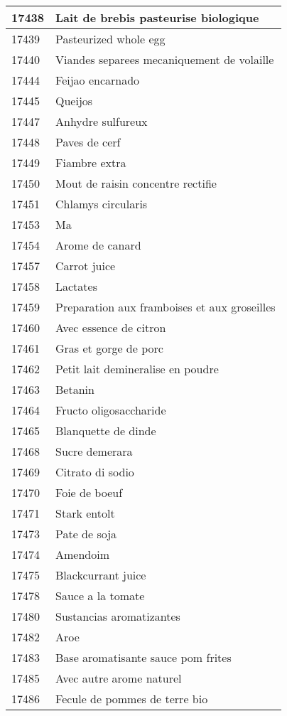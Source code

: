 \begin{longtable}{|l|l|}
17438 & Lait de brebis pasteurise biologique \\ \hline 
17439 & Pasteurized whole egg \\ \hline 
17440 & Viandes separees mecaniquement de volaille \\ \hline 
17444 & Feijao encarnado \\ \hline 
17445 & Queijos \\ \hline 
17447 & Anhydre sulfureux \\ \hline 
17448 & Paves de cerf \\ \hline 
17449 & Fiambre extra \\ \hline 
17450 & Mout de raisin concentre rectifie \\ \hline 
17451 & Chlamys circularis \\ \hline 
17453 & Ma \\ \hline 
17454 & Arome de canard \\ \hline 
17457 & Carrot juice \\ \hline 
17458 & Lactates \\ \hline 
17459 & Preparation aux framboises et aux groseilles \\ \hline 
17460 & Avec essence de citron \\ \hline 
17461 & Gras et gorge de porc \\ \hline 
17462 & Petit lait demineralise en poudre \\ \hline 
17463 & Betanin \\ \hline 
17464 & Fructo oligosaccharide \\ \hline 
17465 & Blanquette de dinde \\ \hline 
17468 & Sucre demerara \\ \hline 
17469 & Citrato di sodio \\ \hline 
17470 & Foie de boeuf \\ \hline 
17471 & Stark entolt \\ \hline 
17473 & Pate de soja \\ \hline 
17474 & Amendoim \\ \hline 
17475 & Blackcurrant juice \\ \hline 
17478 & Sauce a la tomate \\ \hline 
17480 & Sustancias aromatizantes \\ \hline 
17482 & Aroe \\ \hline 
17483 & Base aromatisante sauce pom frites \\ \hline 
17485 & Avec autre arome naturel \\ \hline 
17486 & Fecule de pommes de terre bio \\ \hline 

\end{longtable}
